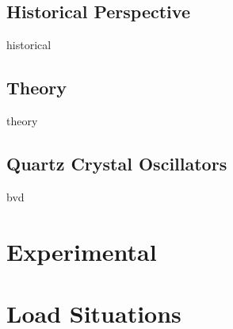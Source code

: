\documentclass[a4paper,titlepage,onecolumn]{report}
\begin{document}
	\section{Historical Perspective}
	{historical}
	\section{Theory}
	{theory}
	\section{Quartz Crystal Oscillators}
	{bvd}
\chapter{Experimental}
\chapter{Load Situations}

\appendix



\end{document}
